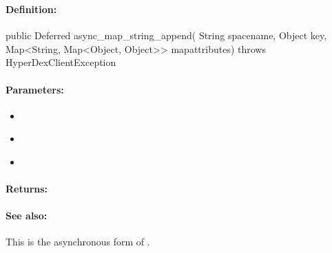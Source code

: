 \pagebreak
\subsubsection{}
\label{api:java:async_map_string_append}


\paragraph{Definition:}
\begin{javacode}
public Deferred async_map_string_append(
        String spacename,
        Object key,
        Map<String, Map<Object, Object>> mapattributes) throws HyperDexClientException
\end{javacode}

\paragraph{Parameters:}
\begin{itemize}[noitemsep]
\item {}\\

\item {}\\

\item {}\\

\end{itemize}

\paragraph{Returns:}


\paragraph{See also:}  This is the asynchronous form of .

\pagebreak
\subsubsection{}
\label{api:java:cond_map_string_append}


